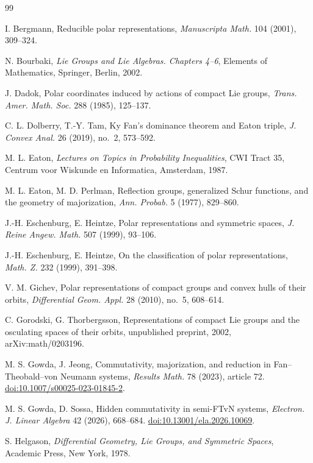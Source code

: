 \documentclass[11pt]{amsart}
\theoremstyle{plain}
\theoremstyle{definition}
\theoremstyle{remark}
\begin{document}
\begin{thebibliography}{99}

 I. Bergmann, Reducible polar representations, \emph{Manuscripta Math.} 104 (2001), 309--324.

 N. Bourbaki, \emph{Lie Groups and Lie Algebras. Chapters 4--6}, Elements of Mathematics, Springer, Berlin, 2002.

 J. Dadok, Polar coordinates induced by actions of compact Lie groups, \emph{Trans. Amer. Math. Soc.} 288 (1985), 125--137.

 C. L. Dolberry, T.-Y. Tam, Ky Fan's dominance theorem and Eaton triple, \emph{J. Convex Anal.} 26 (2019), no.~2, 573--592.

 M. L. Eaton, \emph{Lectures on Topics in Probability Inequalities}, CWI Tract 35, Centrum voor Wiskunde en Informatica, Amsterdam, 1987.

 M. L. Eaton, M. D. Perlman, Reflection groups, generalized Schur functions, and the geometry of majorization, \emph{Ann. Probab.} 5 (1977), 829--860.

 J.-H. Eschenburg, E. Heintze, Polar representations and symmetric spaces, \emph{J. Reine Angew. Math.} 507 (1999), 93--106.

 J.-H. Eschenburg, E. Heintze, On the classification of polar representations, \emph{Math. Z.} 232 (1999), 391--398.

 V. M. Gichev, Polar representations of compact groups and convex hulls of their orbits, \emph{Differential Geom. Appl.} 28 (2010), no.~5, 608--614.

 C. Gorodski, G. Thorbergsson, Representations of compact Lie groups and the osculating spaces of their orbits, unpublished preprint, 2002, arXiv:math/0203196.

 M. S. Gowda, J. Jeong, Commutativity, majorization, and reduction in Fan--Theobald--von Neumann systems, \emph{Results Math.} 78 (2023), article 72. \href{https://doi.org/10.1007/s00025-023-01845-2}{doi:10.1007/s00025-023-01845-2}.

 M. S. Gowda, D. Sossa, Hidden commutativity in semi-FTvN systems, \emph{Electron. J. Linear Algebra} 42 (2026), 668--684. \href{https://doi.org/10.13001/ela.2026.10069}{doi:10.13001/ela.2026.10069}.

 S. Helgason, \emph{Differential Geometry, Lie Groups, and Symmetric Spaces}, Academic Press, New York, 1978.


\end{thebibliography}
\end{document}
